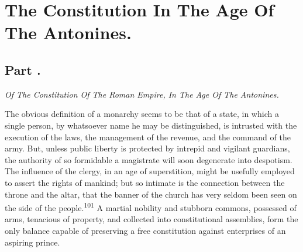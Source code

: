 \chapter{The Constitution In The Age Of The Antonines.}
\section{Part \thesection.}

\textit{Of The Constitution Of The Roman Empire, In The Age Of The
Antonines.}
\vspace{\onelineskip}

The obvious definition of a monarchy seems to be that of a state,
in which a single person, by whatsoever name he may be
distinguished, is intrusted with the execution of the laws, the
management of the revenue, and the command of the army. But,
unless public liberty is protected by intrepid and vigilant
guardians, the authority of so formidable a magistrate will soon
degenerate into despotism. The influence of the clergy, in an age
of superstition, might be usefully employed to assert the rights
of mankind; but so intimate is the connection between the throne
and the altar, that the banner of the church has very seldom been
seen on the side of the people.\textsuperscript{101} A martial nobility and
stubborn commons, possessed of arms, tenacious of property, and
collected into constitutional assemblies, form the only balance
capable of preserving a free constitution against enterprises of
an aspiring prince.



